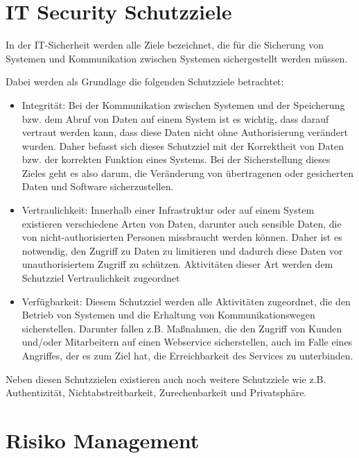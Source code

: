 \section{IT Security Schutzziele}
\label{cha:IT Security Schutzziele}

In der IT-Sicherheit werden alle Ziele bezeichnet, die für die Sicherung von Systemen und Kommunikation zwischen Systemen sichergestellt werden müssen. 

Dabei werden als Grundlage die folgenden Schutzziele betrachtet:
\begin{itemize}
\item Integrität: Bei der Kommunikation zwischen Systemen und der Speicherung bzw. dem Abruf von Daten auf einem System ist es wichtig, dass darauf vertraut werden kann, dass diese Daten nicht ohne Authorisierung verändert wurden. Daher befasst sich dieses Schutzziel mit der Korrektheit von Daten bzw. der korrekten Funktion eines Systems. Bei der Sicherstellung dieses Zieles geht es also darum, die Veränderung von übertragenen oder gesicherten Daten und Software sicherzustellen.
\item Vertraulichkeit: Innerhalb einer Infrastruktur oder auf einem System existieren verschiedene Arten von Daten, darunter auch sensible Daten,  die von nicht-authorisierten Personen missbraucht werden können. Daher ist es notwendig, den Zugriff zu Daten zu limitieren und dadurch diese Daten vor unauthorisiertem Zugriff zu schützen. Aktivitäten dieser Art werden dem Schutzziel Vertraulichkeit zugeordnet
\item Verfügbarkeit: Diesem Schutzziel werden alle Aktivitäten zugeordnet, die den Betrieb von Systemen und die Erhaltung von Kommunikationswegen sicherstellen. Darunter fallen z.B. Maßnahmen, die den Zugriff von Kunden und/oder Mitarbeitern auf einen Webservice sicherstellen, auch im Falle eines Angriffes, der es zum Ziel hat, die Erreichbarkeit des Services zu unterbinden.
\end{itemize}
Neben diesen Schutzzielen existieren auch noch weitere Schutzziele wie z.B. Authentizität, Nichtabstreitbarkeit, Zurechenbarkeit und Privatsphäre.

\section{Risiko Management}


